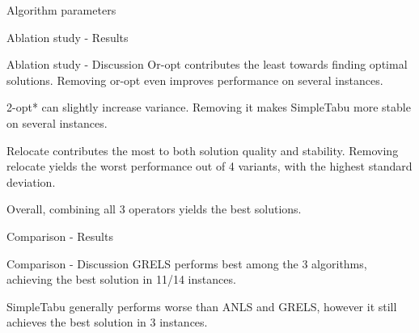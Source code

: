 \documentclass[9pt]{beamer}
\begin{document}
\begin{frame}{Algorithm parameters}
    
\end{frame}

\begin{frame}{Ablation study - Results}

\end{frame}

\begin{frame}{Ablation study - Discussion}
Or-opt contributes the least towards finding optimal solutions. Removing or-opt even improves performance on several instances.

2-opt* can slightly increase variance. Removing it makes SimpleTabu more stable on several instances.

Relocate contributes the most to both solution quality and stability. Removing relocate yields the worst performance out of 4 variants, with the highest standard deviation.

Overall, combining all 3 operators yields the best solutions.
\end{frame}

\begin{frame}{Comparison - Results}

\end{frame}

\begin{frame}{Comparison - Discussion}
GRELS performs best among the 3 algorithms, achieving the best solution in 11/14 instances.

SimpleTabu generally performs worse than ANLS and GRELS, however it still achieves the best solution in 3 instances.
\end{frame}
\end{document}
